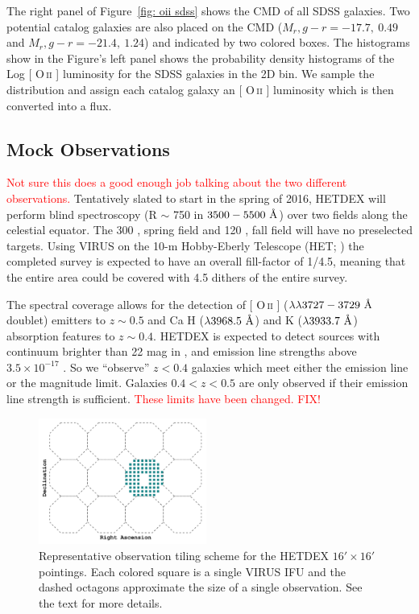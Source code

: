 \documentclass[apj, revtex4]{emulateapj}
\makeatletter
\newcommand{\editorial}[1]{\textcolor{red}{#1}}
\DeclareRobustCommand{\ion}[2]{%
\relax\ifmmode
\ifx\testbx\f@series
{\mathbf{#1\,\mathsc{#2}}}\else
{\mathrm{#1\,\mathsc{#2}}}\fi
\else\textup{#1\,{\mdseries\textsc{#2}}}%
\fi}
\makeatother
\begin{document}
The right panel of Figure~\ref{fig: oii sdss} shows the CMD of all SDSS galaxies. Two potential catalog galaxies are also placed on the CMD ($M_r, g-r = -17.7,~0.49$ and $M_r, g-r = -21.4,~1.24$) and indicated by two colored boxes. The histograms show in the Figure's left panel shows the probability density histograms of the Log [\ion{O}{ii}] luminosity for the SDSS galaxies in the 2D bin. We sample the distribution and assign each catalog galaxy an [\ion{O}{ii}] luminosity which is then converted into a flux.

\subsection{Mock Observations}\label{sec: observations}
\editorial{Not sure this does a good enough job talking about the two different observations.}
Tentatively slated to start in the spring of 2016, HETDEX will perform blind spectroscopy (R $\sim$ 750 in $3500 - 5500~\hbox{\AA}$) over two fields along the celestial equator. The 300 \degsq, spring field and 120 \degsq, fall field will have no preselected targets. Using VIRUS on the 10-m Hobby-Eberly Telescope (HET; \citealt{Ramsey1998}) the completed survey is expected to have an overall fill-factor of 1/4.5, meaning that the entire area could be covered with 4.5 dithers of the entire survey. 

The spectral coverage allows for the detection of [\ion{O}{ii}] ($\lambda\lambda 3727-3729~\hbox{\AA}$ doublet) emitters to $z\sim 0.5$ and Ca H ($\lambda 3968.5~\hbox{\AA}$) and K ($\lambda 3933.7~\hbox{\AA}$) absorption features to $z\sim 0.4$. HETDEX is expected to detect sources with continuum brighter than 22 mag in \sdssg, and emission line strengths above $3.5\times10^{-17}$ \ergscm. So we ``observe'' $z<0.4$ galaxies which meet either the emission line or the magnitude limit. Galaxies $0.4<z<0.5$ are only observed if their emission line strength is sufficient. \editorial{These limits have been changed. FIX!}

\begin{figure} 
	\includegraphics[width=0.49\textwidth]{f01.pdf} 
	\caption{Representative observation tiling scheme for the HETDEX $16' \times 16'$ pointings. Each colored square is a single VIRUS IFU and the dashed octagons approximate the size of a single observation. See the text for more details.} \label{fig: ifu layout} 
\end{figure}
\end{document}
